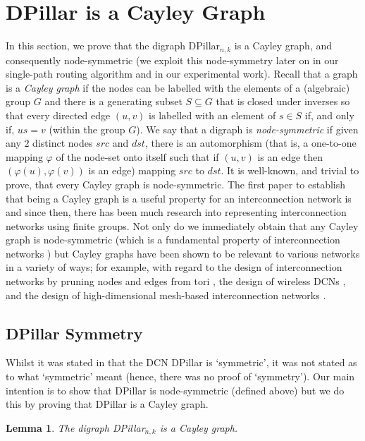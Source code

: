 \documentclass{article}
\newtheorem{lemma}[definition]{Lemma}
\begin{document}
\section{DPillar is a Cayley Graph}\label{sec:Cayley}

In this section, we prove that the digraph DPillar$_{n,k}$ is a Cayley graph,
and consequently node-symmetric (we exploit this node-symmetry later on in our
single-path routing algorithm and in our experimental work). Recall that a graph
is a \emph{Cayley graph} if the nodes can be labelled with the elements of a
(algebraic) group $G$ and there is a generating subset $S\subseteq G$ that is
closed under inverses so that every directed edge $(u,v)$ is labelled with an
element of $s\in S$ if, and only if, $us=v$ (within the group $G$). We say that
a digraph is \emph{node-symmetric} if given any $2$ distinct nodes $src$ and
$dst$, there is an automorphism (that is, a one-to-one mapping $\varphi$ of the
node-set onto itself such that if $(u,v)$ is an edge then
$(\varphi(u),\varphi(v))$ is an edge) mapping $src$ to $dst$. It is well-known,
and trivial to prove, that every Cayley graph is node-symmetric. The first paper
to establish that being a Cayley graph is a useful property for an
interconnection network is \cite{AK89} and since then, there has been much
research into representing interconnection networks using finite groups. Not
only do we immediately obtain that any Cayley graph is node-symmetric (which is
a fundamental property of interconnection networks \cite{DT04}) but Cayley
graphs have been shown to be relevant to various networks in a variety of ways;
for example, with regard to the design of interconnection networks by pruning
nodes and edges from tori \cite{XB07}, the design of wireless DCNs \cite{SSW13},
and the design of high-dimensional mesh-based interconnection networks
\cite{CMB15}.

\subsection{DPillar Symmetry}\label{subsect:symDPillar}

Whilst it was stated in \cite{LYY12} that the DCN DPillar is `symmetric', it was not stated as to what `symmetric' meant (hence, there was no proof of `symmetry'). Our  main intention is to show that DPillar is node-symmetric (defined above) but we do this by proving that DPillar is a Cayley graph.

\begin{lemma}\label{lem:CayGra}
The digraph DPillar$_{n,k}$ is a Cayley graph.
\end{lemma}
\end{document}
